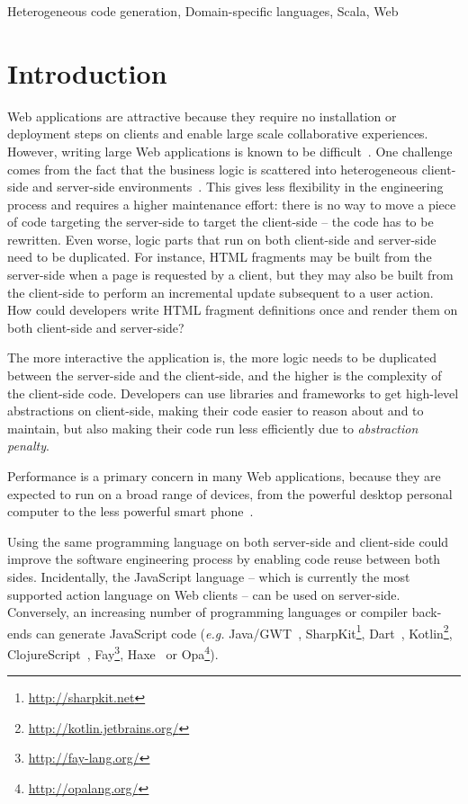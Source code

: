 \documentclass{llncs}
\newcommand{\eg}{\emph{e.g.}}
\begin{document}
\keywords Heterogeneous code generation, Domain-specific languages, Scala, Web

\section{Introduction}


Web applications are attractive because they require no installation or deployment steps on clients
and enable large scale collaborative experiences. However, writing large Web applications is known
to be difficult~\cite{Mikkonen08_SpaghettiJs,Preciado05_RIAMethodologyNecessity}. One challenge
comes from the fact that the business logic is scattered into heterogeneous client-side and
server-side environments~\cite{Echeverria09_RIA,Kuuskeri09_PartitioningClientServer}. This gives
less flexibility in the engineering process and requires a higher maintenance effort: there is no
way to move a piece of code targeting the server-side to target the client-side -- the code has to
be rewritten. Even worse, logic parts that run on both client-side and server-side need to be
duplicated. For instance, HTML fragments may be built from the server-side when a page is requested
by a client, but they may also be built from the client-side to perform an incremental update
subsequent to a user action. How could developers write HTML fragment definitions once and render
them on both client-side and server-side?

The more interactive the application is, the more logic needs to be duplicated between the
server-side and the client-side, and the higher is the complexity of the client-side code.
Developers can use libraries and frameworks to get high-level abstractions on client-side, making
their code easier to reason about and to maintain, but also making their code run less efficiently
due to \emph{abstraction penalty}.

Performance is a primary concern in many Web applications, because they are expected to run on a
broad range of devices, from the powerful desktop personal computer to the less powerful smart
phone~\cite{Souders08_Perf,Huang10_Perf}.

Using the same programming language on both server-side and client-side could improve the software
engineering process by enabling code reuse between both sides. Incidentally, the JavaScript language
-- which is currently the most supported action language on Web clients -- can be used on
server-side. Conversely, an increasing number of programming languages or compiler back-ends can
generate JavaScript code (\eg{} Java/GWT~\cite{Chaganti07_GWT},
SharpKit\footnote{\href{http://sharpkit.net}{http://sharpkit.net}}, Dart~\cite{Griffith11_Dart},
Kotlin\footnote{\href{http://kotlin.jetbrains.org/}{http://kotlin.jetbrains.org/}},
ClojureScript~\cite{McGranaghan11_ClojureScript},
Fay\footnote{\href{http://fay-lang.org/}{http://fay-lang.org/}},
Haxe~\cite{Cannasse08_HaXe} or Opa\footnote{\href{http://opalang.org/}{http://opalang.org/}}).
\end{document}
